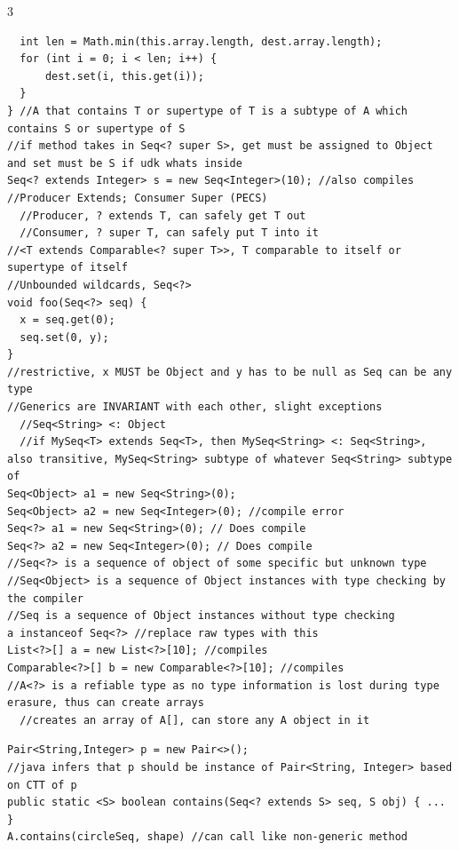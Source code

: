 \documentclass[10pt]{article}
\begin{document}
\begin{multicols*}{3}
\begin{verbatim}
  int len = Math.min(this.array.length, dest.array.length);
  for (int i = 0; i < len; i++) {
      dest.set(i, this.get(i));
  }
} //A that contains T or supertype of T is a subtype of A which contains S or supertype of S
//if method takes in Seq<? super S>, get must be assigned to Object and set must be S if udk whats inside
Seq<? extends Integer> s = new Seq<Integer>(10); //also compiles
//Producer Extends; Consumer Super (PECS)
  //Producer, ? extends T, can safely get T out
  //Consumer, ? super T, can safely put T into it
//<T extends Comparable<? super T>>, T comparable to itself or supertype of itself
//Unbounded wildcards, Seq<?>
void foo(Seq<?> seq) {
  x = seq.get(0);
  seq.set(0, y);
}
//restrictive, x MUST be Object and y has to be null as Seq can be any type
//Generics are INVARIANT with each other, slight exceptions
  //Seq<String> <: Object
  //if MySeq<T> extends Seq<T>, then MySeq<String> <: Seq<String>, also transitive, MySeq<String> subtype of whatever Seq<String> subtype of
Seq<Object> a1 = new Seq<String>(0); 
Seq<Object> a2 = new Seq<Integer>(0); //compile error
Seq<?> a1 = new Seq<String>(0); // Does compile
Seq<?> a2 = new Seq<Integer>(0); // Does compile
//Seq<?> is a sequence of object of some specific but unknown type
//Seq<Object> is a sequence of Object instances with type checking by the compiler
//Seq is a sequence of Object instances without type checking
a instanceof Seq<?> //replace raw types with this
List<?>[] a = new List<?>[10]; //compiles
Comparable<?>[] b = new Comparable<?>[10]; //compiles
//A<?> is a refiable type as no type information is lost during type erasure, thus can create arrays
  //creates an array of A[], can store any A object in it
\end{verbatim}
\begin{verbatim}
Pair<String,Integer> p = new Pair<>();
//java infers that p should be instance of Pair<String, Integer> based on CTT of p
public static <S> boolean contains(Seq<? extends S> seq, S obj) { ... }
A.contains(circleSeq, shape) //can call like non-generic method
\end{verbatim}

\end{multicols*}
\end{document}
